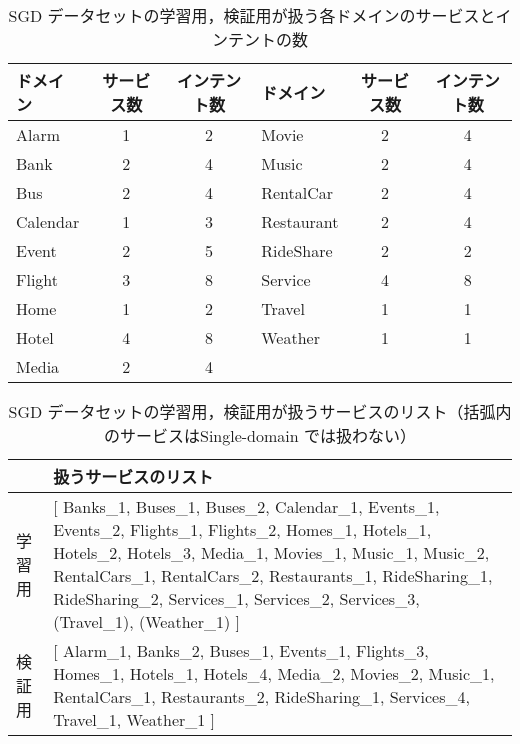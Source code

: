 \begin{table}[thb]
    \centering
    \caption{SGD データセットの学習用，検証用が扱う各ドメインのサービスとインテントの数}
    \label{tab:domain}
    \begin{tabular}{|l|c|c||l|c|c|} \hline
        ドメイン & サービス数 & インテント数 & ドメイン & サービス数 & インテント数 \\ \hline
        Alarm & 1 & 2  & Movie & 2 & 4  \\
        Bank & 2 & 4 & Music & 2 & 4 \\
        Bus & 2 & 4 & RentalCar & 2 & 4 \\
        Calendar & 1 & 3 & Restaurant & 2 & 4 \\
        Event & 2 & 5 & RideShare & 2 & 2 \\
        Flight & 3 & 8 & Service & 4 & 8 \\
        Home & 1 & 2 & Travel & 1 & 1 \\
        Hotel & 4 & 8 & Weather & 1 & 1 \\
        Media & 2 & 4 & & & \\
         \hline
    \end{tabular}
\end{table}
\begin{table}[thb]
    \centering
    \caption{SGD データセットの学習用，検証用が扱うサービスのリスト（括弧内のサービスはSingle-domain では扱わない）}
    \label{tab:domain}
    \begin{tabularx}{150mm}{|l|L|} \hline
        & 扱うサービスのリスト \\ \hline
        学習用 & [ Banks\_1, Buses\_1, Buses\_2, Calendar\_1, Events\_1, Events\_2, Flights\_1, Flights\_2, Homes\_1, Hotels\_1, Hotels\_2, Hotels\_3, Media\_1, Movies\_1, Music\_1, Music\_2, RentalCars\_1, RentalCars\_2, Restaurants\_1, RideSharing\_1, RideSharing\_2, Services\_1, Services\_2, Services\_3, (Travel\_1), (Weather\_1) ] \\ \hline
        検証用 & [ Alarm\_1, Banks\_2, Buses\_1, Events\_1, Flights\_3, Homes\_1, Hotels\_1, Hotels\_4, Media\_2, Movies\_2, Music\_1, RentalCars\_1, Restaurants\_2, RideSharing\_1, Services\_4, Travel\_1, Weather\_1 ] \\ \hline
    \end{tabularx}
\end{table}
